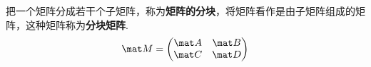 

把一个矩阵分成若干个子矩阵，称为\textbf{矩阵的分块}，将矩阵看作是由子矩阵组成的矩阵，这种矩阵称为\textbf{分块矩阵}.
\begin{equation}\mat M=
\begin{pmatrix}
\mat A & \mat B\\
\mat C & \mat D
\end{pmatrix}
\end{equation}